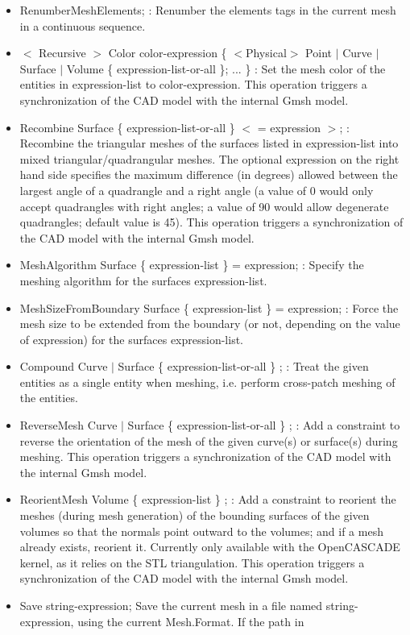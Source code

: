 \documentclass[dvipdfmx, 9pt, a4paper]{article}
\numberwithin{equation}{section}
\begin{document}
\begin{itemize}
\item RenumberMeshElements; : Renumber the elements tags in the current mesh in a continuous sequence.
\item $<$ Recursive $>$ Color color-expression \{ $<$Physical$>$ Point $|$ Curve $|$ Surface $|$ Volume \{ expression-list-or-all \}; ... \} : Set the mesh color of the entities in expression-list to color-expression. This operation triggers a synchronization of the CAD model with the internal Gmsh model.
\item Recombine Surface \{ expression-list-or-all \} $<$ = expression $>$; : Recombine the triangular meshes of the surfaces listed in expression-list into mixed triangular/quadrangular meshes. The optional expression on the right hand side specifies the maximum difference (in degrees) allowed between the largest angle of a quadrangle and a right angle (a value of 0 would only accept quadrangles with right angles; a value of 90 would allow degenerate quadrangles; default value is 45). This operation triggers a synchronization of the CAD model with the internal Gmsh model.
\item MeshAlgorithm Surface \{ expression-list \} = expression; : Specify the meshing algorithm for the surfaces expression-list.
\item MeshSizeFromBoundary Surface \{ expression-list \} = expression; : Force the mesh size to be extended from the boundary (or not, depending on the value of expression) for the surfaces expression-list.
\item Compound Curve $|$ Surface \{ expression-list-or-all \} ; : Treat the given entities as a single entity when meshing, i.e. perform cross-patch meshing of the entities.
\item ReverseMesh Curve $|$ Surface \{ expression-list-or-all \} ; : Add a constraint to reverse the orientation of the mesh of the given curve(s) or surface(s) during meshing. This operation triggers a synchronization of the CAD model with the internal Gmsh model.
\item ReorientMesh Volume \{ expression-list \} ; : Add a constraint to reorient the meshes (during mesh generation) of the bounding surfaces of the given volumes so that the normals point outward to the volumes; and if a mesh already exists, reorient it. Currently only available with the OpenCASCADE kernel, as it relies on the STL triangulation. This operation triggers a synchronization of the CAD model with the internal Gmsh model.
\item Save string-expression; Save the current mesh in a file named string-expression, using the current Mesh.Format. If the path in

\end{itemize}
\end{document}
